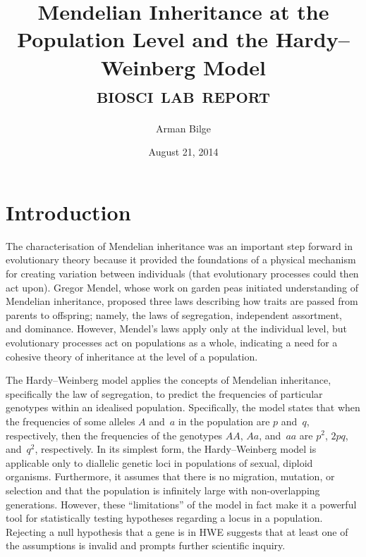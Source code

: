 \documentclass{article}
\title{Mendelian Inheritance at the Population Level and the Hardy--Weinberg
           Model \\
       \Large\textsc{biosci \oldstylenums{210} lab report}}
\author{Arman Bilge}
\date{August 21, 2014}
\begin{document}
    \maketitle

    \section*{Introduction}

        The characterisation of Mendelian inheritance was an important step
            forward in evolutionary theory because it provided the
            foundations of a physical mechanism for creating variation between
            individuals (that evolutionary processes could then act upon).
        Gregor Mendel, whose work on garden peas initiated understanding of
            Mendelian inheritance, proposed three laws describing how traits
            are passed from parents to offspring; namely, the laws of
            segregation, independent assortment, and dominance.
        However, Mendel's laws apply only at the individual level, but
            evolutionary processes act on populations as a whole, indicating a
            need for a cohesive theory of inheritance at the level of a
            population.

        The Hardy--Weinberg model applies the concepts of Mendelian
            inheritance, specifically the law of segregation, to predict the
            frequencies of particular genotypes within an idealised population.
        Specifically, the model states that when the frequencies of some
            alleles $A$ and~$a$ in the population are $p$ and~$q$,
            respectively, then the frequencies of the genotypes $AA$, $Aa$,
            and~$aa$ are $p^2$, $2pq$, and~$q^2$, respectively.
        In its simplest form, the Hardy--Weinberg model is applicable only to
            diallelic genetic loci in populations of sexual, diploid organisms.
        Furthermore, it assumes that there is no migration, mutation, or
            selection and that the population is infinitely large with
            non-overlapping generations.
        However, these \enquote{limitations} of the model in fact make it a
            powerful tool for statistically testing hypotheses regarding a
            locus in a population.
        Rejecting a null hypothesis that a gene is in \ac{HWE} suggests that
            at least one of the assumptions is invalid and prompts further
            scientific inquiry.
\end{document}

